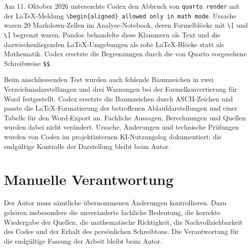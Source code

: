 \documentclass[
  ngerman,
  a4paper,
  DIV=11,
  oneside]{scrreprt}
\begin{document}
Am 11. Oktober 2026 untersuchte Codex den Abbruch von
\texttt{quarto\ render} mit der LaTeX-Meldung
\texttt{\textbackslash{}begin\{aligned\}\ allowed\ only\ in\ math\ mode}.
Ursache waren 20 Markdown-Zellen im Analyse-Notebook, deren Formelblöcke
mit \texttt{\textbackslash{}{[}} und \texttt{\textbackslash{}{]}}
begrenzt waren. Pandoc behandelte diese Klammern als Text und die
dazwischenliegenden LaTeX-Umgebungen als rohe LaTeX-Blöcke statt als
Mathematik. Codex ersetzte die Begrenzungen durch die von Quarto
vorgesehene Schreibweise \texttt{\$\$}.

Beim anschliessenden Test wurden auch fehlende Baumzeichen in zwei
Verzeichnisdarstellungen und drei Warnungen bei der Formelkonvertierung
für Word festgestellt. Codex ersetzte die Baumzeichen durch
ASCII-Zeichen und passte die LaTeX-Formatierung der betroffenen
Ablaufdarstellungen und einer Tabelle für den Word-Export an. Fachliche
Aussagen, Berechnungen und Quellen wurden dabei nicht verändert.
Ursache, Änderungen und technische Prüfungen wurden von Codex im
projektinternen KI-Nutzungslog dokumentiert; die endgültige Kontrolle
der Darstellung bleibt beim Autor.

\section{Manuelle Verantwortung}\label{manuelle-verantwortung}

Der Autor muss sämtliche übernommenen Änderungen kontrollieren. Dazu
gehören insbesondere die unveränderte fachliche Bedeutung, die korrekte
Wiedergabe der Quellen, die mathematische Richtigkeit, die
Nachvollziehbarkeit des Codes und der Erhalt des persönlichen
Schreibtons. Die Verantwortung für die endgültige Fassung der Arbeit
bleibt beim Autor.
\end{document}
